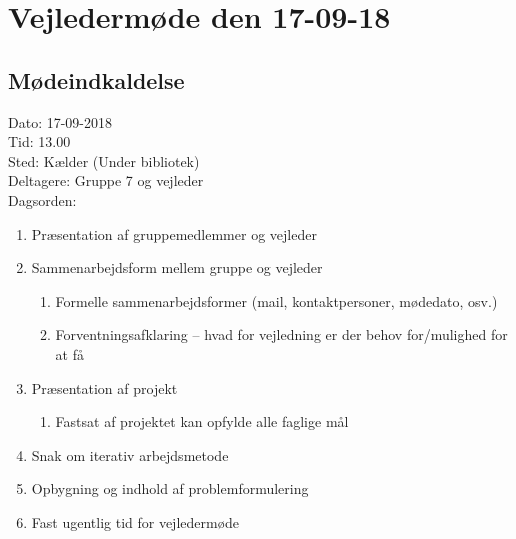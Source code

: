 \section{Vejledermøde den 17-09-18}
\subsection{Mødeindkaldelse}
Dato: 17-09-2018
\\Tid: 13.00
\\Sted: Kælder (Under bibliotek)
\\Deltagere: Gruppe 7 og vejleder
\\Dagsorden:
\begin{enumerate}
    \item Præsentation af gruppemedlemmer og vejleder
    \item Sammenarbejdsform mellem gruppe og vejleder
    \begin{enumerate}
        \item Formelle sammenarbejdsformer (mail, kontaktpersoner, mødedato, osv.)
        \item Forventningsafklaring – hvad for vejledning er der behov for/mulighed for at få
    \end{enumerate}
    \item Præsentation af projekt
    \begin{enumerate}
        \item Fastsat af projektet kan opfylde alle faglige mål 
    \end{enumerate}
    \item Snak om iterativ arbejdsmetode
    \item Opbygning og indhold af problemformulering
    \item Fast ugentlig tid for vejledermøde
\end{enumerate}
 
